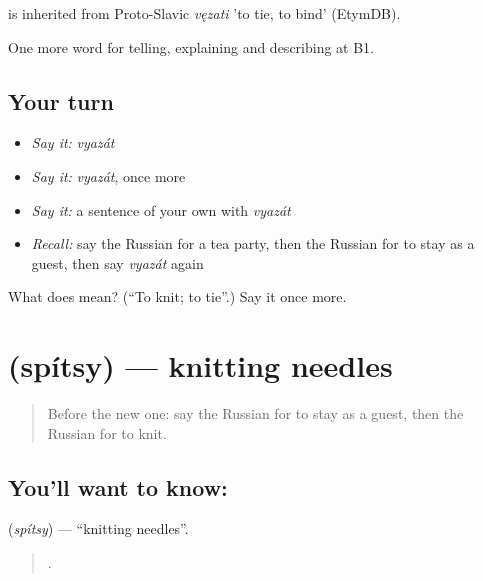 \begin{cousinweb}
\emph{} is inherited from Proto-Slavic \emph{vęzati} 'to tie, to bind' (EtymDB).
\end{cousinweb}

\begin{grammarlens}[title={What you've built}]
One more word for telling, explaining and describing at B1.
\end{grammarlens}

\subsection*{Your turn}
\begin{itemize}
\raggedright
  \item \emph{Say it:} \emph{vyazát}
  \item \emph{Say it:} \emph{vyazát}, once more
  \item \emph{Say it:} a sentence of your own with \emph{vyazát}
  \item \emph{Recall:} say the Russian for a tea party, then the Russian for to stay as a guest, then say \emph{vyazát} again
\end{itemize}

\begin{tcolorbox}[breakable,colback=teal!4,colframe=teal!35!black,title={Before you move on}]
What does  mean? (\textquotedblleft{}To knit; to tie\textquotedblright{}.) Say it once more.
\end{tcolorbox}
\section[\texorpdfstring{\ru{спицы} (spítsy)}{спицы (spítsy)}]{ (spítsy) — knitting needles}

\label{lesson:RU-C500-spitsy}



\begin{quote}
Before the new one: say the Russian for to stay as a guest, then the Russian for to knit.
\end{quote}

\subsection*{You'll want to know: }
\textbf{} (\emph{spítsy}) — \textquotedblleft{}knitting needles\textquotedblright{}.

\begin{quote}
     .
\end{quote}

